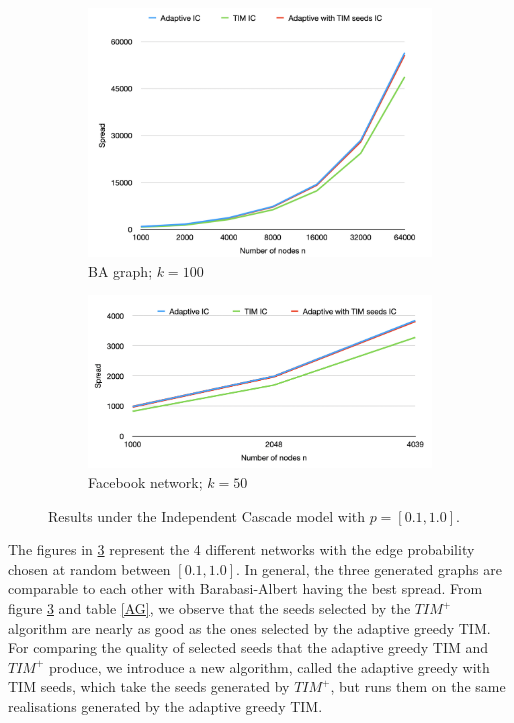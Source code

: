 \begin{figure}
\hfill
\begin{subfigure}{0.4\textwidth}
    \includegraphics[width=1\linewidth]{GSSI_thesisProposal/figures/BA_IC.png}
    \caption{BA graph; $k=100$}
    \label{fig:third}
\end{subfigure}
\hfill
\begin{subfigure}{0.4\textwidth}
    \includegraphics[width=1\linewidth]{GSSI_thesisProposal/figures/Fb_IC.png}
    \caption{Facebook network; $k=50$}
    \label{fig:fourth}
\end{subfigure}
        
\caption{Results under the Independent Cascade model with $p=[0.1,1.0]$.}
\label{fig:figure_IC}
\end{figure}


The figures in \ref{fig:figure_IC} represent the 4 different networks with the edge probability chosen at random between $[0.1,1.0]$. In general, the three generated graphs are comparable to each other with Barabasi-Albert having the best spread. From figure  \ref{fig:figure_IC} and table \ref{AG}, we observe that the seeds selected by the $TIM^+$ algorithm are nearly as good as the ones selected by the adaptive greedy TIM. For comparing the quality of selected seeds that the adaptive greedy TIM and $TIM^+$ produce, we introduce a new algorithm, called the adaptive greedy with TIM seeds, which take the seeds generated by $TIM^+$, but runs them on the same realisations generated by the adaptive greedy TIM. 


